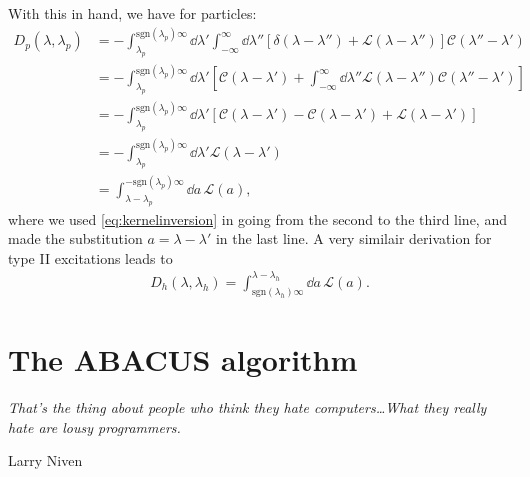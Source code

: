 \documentclass[11pt, a4paper]{report} %
\newcommand{\inversetruncc}{\mathcal{L}}
\newcommand{\kernel}{\mathcal{C}}
\begin{document}
With this in hand, we have for particles:
\begin{align}
	D_p(\lambda, \lambda_p) &= - \int_{\lambda_p}^{\textrm{sgn}(\lambda_p)\infty} \dd \lambda' \int_{-\infty}^{\infty} \dd  \lambda'' \left[\delta(\lambda-\lambda'') + \inversetruncc(\lambda-\lambda'') \right]\kernel(\lambda''-\lambda')\\
	&= - \int_{\lambda_p}^{\textrm{sgn}(\lambda_p)\infty} \dd \lambda' \left[\kernel(\lambda-\lambda') + \int_{-\infty}^{\infty} \dd  \lambda'' \inversetruncc(\lambda-\lambda'') \kernel(\lambda''-\lambda')\right]\\
	&= - \int_{\lambda_p}^{\textrm{sgn}(\lambda_p)\infty} \dd \lambda' \left[\kernel(\lambda-\lambda') - \kernel(\lambda-\lambda') + \inversetruncc(\lambda-\lambda')\right]\\
	&= - \int_{\lambda_p}^{\textrm{sgn}(\lambda_p)\infty} \dd \lambda' \inversetruncc(\lambda-\lambda')\\
	&=  \int_{\lambda-\lambda_p}^{-\textrm{sgn}(\lambda_p)\infty} \dd a \, \inversetruncc(a),
\end{align}
where we used \cref{eq:kernelinversion} in going from the second to the third line, and made the substitution \(a = \lambda-\lambda'\) in the last line.
A very similair derivation for type II excitations leads to
\begin{align}
	D_h(\lambda,\lambda_h) = \int_{\textrm{sgn}(\lambda_h)\infty}^{\lambda-\lambda_h} \dd a\, \inversetruncc(a).
\end{align}




\chapter{The ABACUS algorithm}\label{chap:abacus}

\epigraph{\textit{That's the thing about people who think they hate computers\ldots What they really hate are lousy programmers.}}{Larry Niven}
\end{document}
